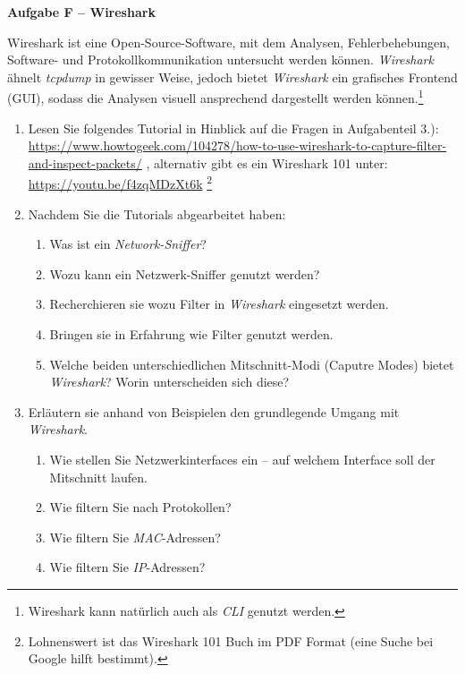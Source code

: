 \documentclass[paper=a4,fontsize=11pt]{scrartcl}%
\numberwithin{equation}{section}
\begin{document}
\begin{center}\Large{\textbf{Aufgabe F -- Wireshark}}\end{center}\vskip0.25in
Wireshark ist eine Open-Source-Software, mit dem Analysen, Fehlerbehebungen, Software- und Protokollkommunikation untersucht werden können. \emph{Wireshark} ähnelt \emph{tcpdump} in gewisser Weise, jedoch bietet \emph{Wireshark} ein grafisches Frontend (GUI), sodass die Analysen visuell ansprechend dargestellt werden können.\footnote{Wireshark kann natürlich auch als \emph{CLI} genutzt werden.}
\begin{enumerate}
	\item Lesen Sie folgendes Tutorial in Hinblick auf die Fragen in Aufgabenteil 3.): \url{https://www.howtogeek.com/104278/how-to-use-wireshark-to-capture-filter-and-inspect-packets/}
	, alternativ gibt es ein Wireshark 101 unter: \url{https://youtu.be/f4zqMDzXt6k} 
	\footnote{Lohnenswert ist das Wireshark 101 Buch im PDF Format (eine Suche bei Google hilft bestimmt).}
	\item Nachdem Sie die Tutorials abgearbeitet haben:
	\begin{enumerate}
		\item Was ist ein \emph{Network-Sniffer}?
		\item Wozu kann ein Netzwerk-Sniffer genutzt werden?
		\item Recherchieren sie wozu Filter in \emph{Wireshark} eingesetzt werden.
		\item Bringen sie in Erfahrung wie Filter genutzt werden.
		\item Welche beiden unterschiedlichen Mitschnitt-Modi (Caputre Modes) bietet \emph{Wireshark}? Worin unterscheiden sich diese?
	\end{enumerate}
	\item Erläutern sie anhand von Beispielen den grundlegende Umgang mit \emph{Wireshark}.
	\begin{enumerate}
		\item Wie stellen Sie Netzwerkinterfaces ein -- auf welchem Interface soll der Mitschnitt laufen.
		\item Wie filtern Sie nach Protokollen?
		\item Wie filtern Sie \emph{MAC}-Adressen?
		\item Wie filtern Sie \emph{IP}-Adressen?
	\end{enumerate}
\end{enumerate}
\end{document}
